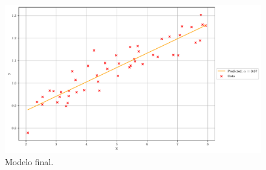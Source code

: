 \documentclass[a4paper, 12pt]{article}
\begin{document}
\begin{figure}[!h]
    \centering
    \includegraphics[width=1\textwidth]{../imgs/FINAL_predicted.pdf}
    \caption{Modelo final.}
    \label{fig:FINAL_predicted}
\end{figure}
\end{document}
